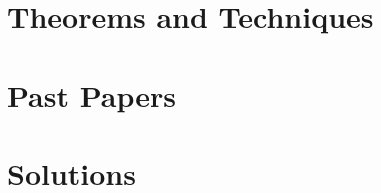 \documentclass[11pt, dvipsnames]{scrbook}
\begin{document}
\tableofcontents
\part{Theorems and Techniques}





\part{Past Papers}












\part{Solutions}











\end{document}
